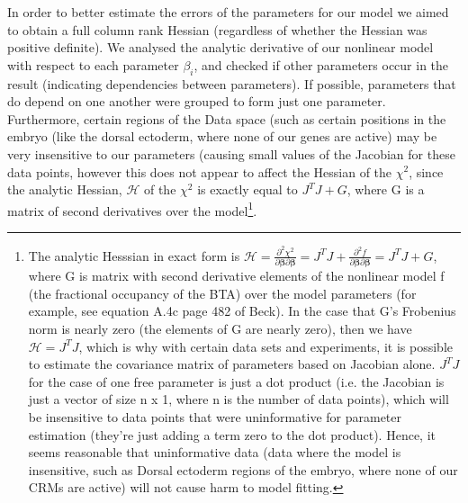 In order to better estimate the errors of the parameters for our model we aimed to obtain a full column rank Hessian (regardless of whether the Hessian was positive definite).  We analysed the analytic derivative of our nonlinear model with respect to each parameter $\beta_i$, and checked if other parameters occur in the result (indicating dependencies between parameters).  If possible, parameters that do depend on one another were grouped to form just one parameter\cite{beck}.  Furthermore, certain regions of the Data space (such as certain positions in the embryo (like the dorsal ectoderm, where none of our genes are active) may be very insensitive to our parameters (causing small values of the Jacobian for these data points, however this does not appear to affect the Hessian of the $\chi^2$, since the analytic Hessian, $\mathcal H$ of the $\chi^2$ is exactly equal to $J^TJ+G$, where G is a matrix of second derivatives over the model\footnote{The analytic Hesssian in exact form is  $\mathcal H=\frac{\partial^2{\chi^2}}{\partial{\mathbf{\beta}}\partial{\mathbf{\beta}}} = J^TJ + \frac{\partial^2{f}}{\partial{\mathbf{\beta}}\partial{\mathbf{\beta}}} = J^TJ +G$, where G is matrix with second derivative elements of the nonlinear model f (the fractional occupancy of the BTA) over the model parameters (for example, see equation A.4c page 482 of Beck\cite{beck}).  In the case that G's Frobenius norm is nearly zero (the elements of G are nearly zero), then we have $\mathcal H=J^TJ$, which is why with certain data sets and experiments, it is possible to estimate the covariance matrix of parameters based on Jacobian alone.  $J^TJ$ for the case of one free parameter is just a dot product (i.e. the Jacobian is just a vector of size n x 1, where n is the number of data points), which will be insensitive to data points that were uninformative for parameter estimation (they're just adding a term zero to the dot product).  Hence, it seems reasonable that uninformative data (data where the model is insensitive, such as Dorsal ectoderm regions of the embryo, where none of our CRMs are active) will not cause harm to model fitting.}.  

